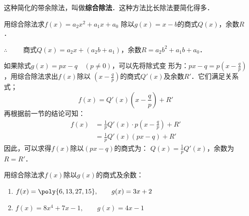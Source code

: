 这种简化的带余除法，叫做\textbf{综合除法}．这种方法比长除法要简化得多．

\begin{example}
    用综合除法求$f(x)=a_2x^2+a_1x+a_0$ 除以$g(x)=x-b$的商式$Q(x)$，余数$R$．
\end{example}

\begin{solution}
    \begin{center}
      \end{center}
$\therefore\qquad $ 商式$Q(x)=a_2x+(a_2b+a_1)$，余数$R=a_2b^2+a_1b+a_0$．
\end{solution}

如果除式$g(x)=px-q\quad (p\ne 0)$，可以先将除式变
形为：$px-q=p\left(x-\frac{q}{p}\right)$，用综合除法求出$f(x)$除以
$\left(x-\frac{q}{p}\right)$的商式$Q'(x)$及余数$R'$．它们满足关系式；
\[f(x)=Q'(x)\left(x-\frac{q}{p}\right)+R' \]
再根据前一节的结论可知：
\[\begin{split}
f(x)&=\frac{1}{p}Q'(x)\cdot p\left(x-\frac{q}{p}\right)+R'\\
&=\frac{1}{p}Q'(x)(px-q)+R'
\end{split}\]
因此，可以求得$f(x)$除以$(px-q)$的商式为：
$Q(x)=\frac{1}{p}Q'(x)$，余数为$R=R'$．

\begin{example}
    用综合除法求$f(x)$除以$g(x)$的商式及余数：
\begin{enumerate}
    \item $f(x)=\poly{6,13,27,15},\qquad g(x)=3x+2$
    \item $f(x)=8x^4+7x-1,\qquad g(x)=4x-1$
\end{enumerate}    
\end{example}

